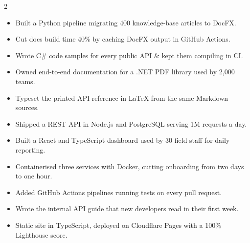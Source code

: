 \documentclass[10pt,a4paper,withhyper]{altacv}
\begin{document}


\makecvheader


\begin{paracol}{2}

\begin{itemize}
\item Built a Python pipeline migrating 400 knowledge-base articles to DocFX. %
\item Cut docs build time 40\% by caching DocFX output in GitHub Actions. %
\item Wrote C\# code samples for every public API \& kept them compiling in CI. %
\item Owned end-to-end documentation for a .NET PDF library used by 2,000 teams. %
\item Typeset the printed API reference in LaTeX from the same Markdown sources. %
\end{itemize}

\divider

\begin{itemize}
\item Shipped a REST API in Node.js and PostgreSQL serving 1M requests a day. %
\item Built a React and TypeScript dashboard used by 30 field staff for daily reporting. %
\item Containerised three services with Docker, cutting onboarding from two days to one hour. %
\item Added GitHub Actions pipelines running tests on every pull request. %
\item Wrote the internal API guide that new developers read in their first week. %
\end{itemize}


\begin{itemize}
\item Static site in TypeScript, deployed on Cloudflare Pages with a 100\% Lighthouse score. %
\end{itemize}


\end{paracol}
\end{document}
